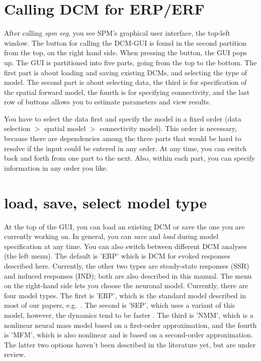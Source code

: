 \section{Calling DCM for ERP/ERF}
After calling \textit{spm eeg}, you see SPM's graphical user interface,
the top-left window. The button for calling the DCM-GUI is found
in the second partition from the top, on the right hand side. When
pressing the button, the GUI pops up. The GUI is partitioned into five
parts, going from the top to the bottom. The first part is about
loading and saving existing DCMs, and selecting the type of model. The second part is about selecting
data, the third is for specification of the spatial forward model, the
fourth is for specifying connectivity, and the last row of
buttons allows you to estimate parameters and view results.

You have to select the data first and specify the model in
a fixed order (data selection $>$ spatial model $>$
connectivity model). This order is necessary, because there are
dependencies among the three parts that would be hard to resolve
if the input could be entered in any order. At any time, you can switch back and forth from one part to
the next. Also, within each part, you can specify information in any
order you like.

\section{load, save, select model type}
At the top of the GUI, you can load an existing DCM or save the one
you are currently working on. In general, you can \textit{save} and
\textit{load} during model specification at any time. You can also
switch between different DCM analyses (the left menu). The default is 'ERP' which is DCM
for evoked responses described here. Currently, the other two types are steady-state responses
(SSR) and induced responses (IND); both are also described in this
manual. The menu on the right-hand side lets you choose the neuronal model. Currently, there are four model types. The first is 'ERP', which is the standard model described in most of our papers, e.g.~\cite{od_dcm_erp}. The second is 'SEP', which uses a variant of this model, however, the dynamics tend to be faster \cite{andre_sigmoid}. The third is 'NMM', which is a nonlinear neural mass model based on a first-order approximation, and the fourth is 'MFM', which is also nonlinear and is based on a second-order approximation. The latter two options haven't been described in the literature yet, but are under review.


